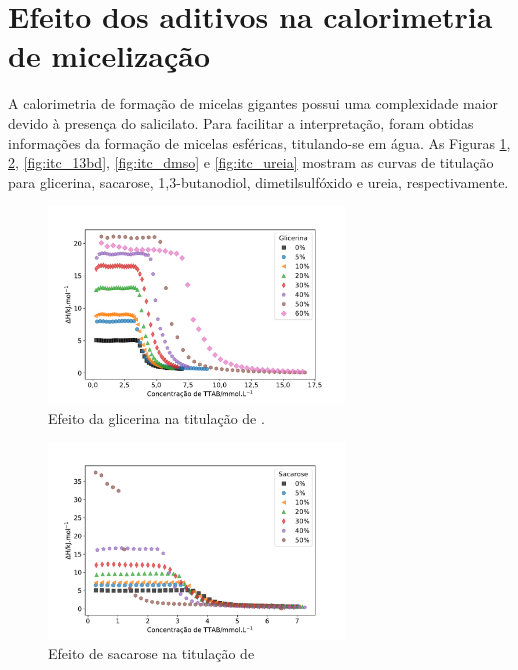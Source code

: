 		\section{Efeito dos aditivos na calorimetria de micelização}  
		\label{sec:efeito_aditivos_calorimetria_me}
		A calorimetria de formação de micelas gigantes possui uma complexidade maior devido à presença do salicilato. Para facilitar a interpretação, foram obtidas informações da formação de micelas esféricas, titulando-se \TTAB{} em água. As Figuras \ref{fig:itc_glicerina}, \ref{fig:itc_sacarose}, \ref{fig:itc_13bd}, \ref{fig:itc_dmso} e \ref{fig:itc_ureia} mostram as curvas de titulação para glicerina, sacarose, 1,3-butanodiol, dimetilsulfóxido e ureia, respectivamente.
					
			
			\begin{figure}[h]
				\centering
				\includegraphics[width=0.7\textwidth]{imagens/itc/ITC_glic}
				\caption{Efeito da glicerina na titulação de \TTAB.}
				\label{fig:itc_glicerina}
			\end{figure} 
		
			\begin{figure}[h]
				\centering
				\includegraphics[width=0.7\textwidth]{imagens/itc/ITC_sac}
				\caption{Efeito de sacarose na titulação de \TTAB}
				\label{fig:itc_sacarose}
			\end{figure} 
			

